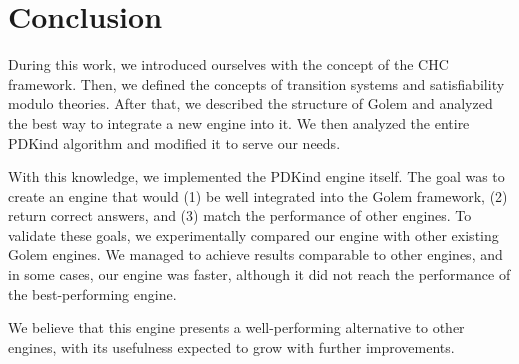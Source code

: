 \chapter{Conclusion}
During this work, we introduced ourselves with the concept of the CHC framework. Then, we defined the concepts of transition systems and satisfiability modulo theories. After that, we described the structure of Golem and analyzed the best way to integrate a new engine into it. We then analyzed the entire PDKind algorithm and modified it to serve our needs.

With this knowledge, we implemented the PDKind engine itself. The goal was to create an engine that would (1) be well integrated into the Golem framework, (2) return correct answers, and (3) match the performance of other engines. To validate these goals, we experimentally compared our engine with other existing Golem engines. We managed to achieve results comparable to other engines, and in some cases, our engine was faster, although it did not reach the performance of the best-performing engine.

We believe that this engine presents a well-performing alternative to other engines, with its usefulness expected to grow with further improvements.